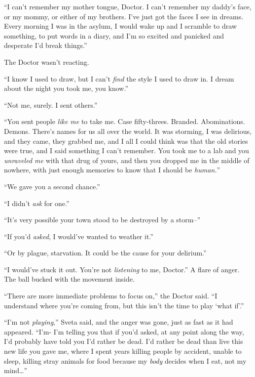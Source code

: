 ``I can't remember my mother tongue, Doctor.  I can't remember my daddy's face, or my mommy, or either of my brothers.  I've just got the faces I see in dreams.  Every morning I was in the asylum, I would wake up and I scramble to draw something, to put words in a diary, and I'm so excited and panicked and desperate I'd break things.''



The Doctor wasn't reacting.



``I know I used to draw, but I can't \emph{find} the style I used to draw in.  I dream about the night you took me, you know.''



``Not me, surely.  I sent others.''



``You sent people \emph{like me} to take me.  Case fifty-threes.  Branded.  Abominations.  Demons.  There's names for us all over the world.  It was storming, I was delirious, and they came, they grabbed me, and I all I could think was that the old stories were true, and I said something I can't remember.  You took me to a lab and you \emph{unraveled me }with that drug of yours, and then you dropped me in the middle of nowhere, with just enough memories to know that I should be \emph{human.}''



``We gave you a second chance.''



``I didn't \emph{ask} for one.''



``It's very possible your town stood to be destroyed by a storm--''



``If you'd \emph{asked}, I would've wanted to weather it.''



``Or by plague, starvation.  It could be the cause for your delirium.''



``I would've stuck it out.  You're not \emph{listening} to me, Doctor.''  A flare of anger.  The ball bucked with the movement inside.



``There are more immediate problems to focus on,'' the Doctor said.  ``I understand where you're coming from, but this isn't the time to play `what if'.''



``I'm not \emph{playing},'' Sveta said, and the anger was gone, just as fast as it had appeared.  ``I'm- I'm telling you that if you'd asked, at any point along the way, I'd probably have told you I'd rather be dead.  I'd rather be dead than live this new life you gave me, where I spent years killing people by accident, unable to sleep, killing stray animals for food because my \emph{body} decides when I eat, not my mind\ldots''




